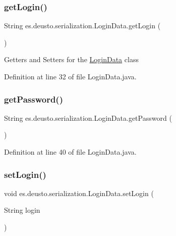 \subsubsection{\texorpdfstring{get\+Login()}{getLogin()}}
{\footnotesize\ttfamily String es.\+deusto.\+serialization.\+Login\+Data.\+get\+Login (\begin{DoxyParamCaption}{ }\end{DoxyParamCaption})}

Getters and Setters for the \hyperlink{classes_1_1deusto_1_1serialization_1_1_login_data}{Login\+Data} class 

Definition at line 32 of file Login\+Data.\+java.

\mbox{\label{classes_1_1deusto_1_1serialization_1_1_login_data_a39504f63e22c01e184427621c9b7cb12}} 
\subsubsection{\texorpdfstring{get\+Password()}{getPassword()}}
{\footnotesize\ttfamily String es.\+deusto.\+serialization.\+Login\+Data.\+get\+Password (\begin{DoxyParamCaption}{ }\end{DoxyParamCaption})}



Definition at line 40 of file Login\+Data.\+java.

\mbox{\label{classes_1_1deusto_1_1serialization_1_1_login_data_affe30ee001271b2264106eeecc302882}} 
\subsubsection{\texorpdfstring{set\+Login()}{setLogin()}}
{\footnotesize\ttfamily void es.\+deusto.\+serialization.\+Login\+Data.\+set\+Login (\begin{DoxyParamCaption}\item[{String}]{login }\end{DoxyParamCaption})}



